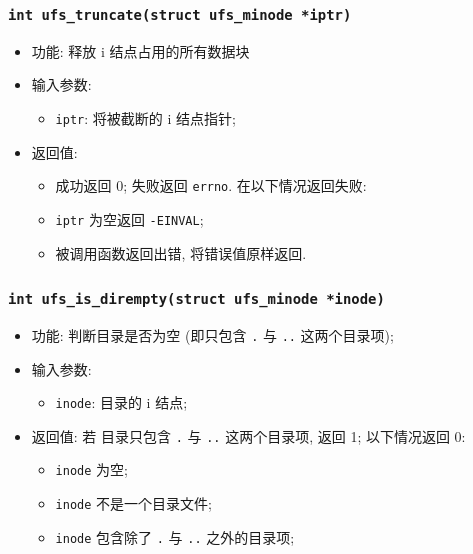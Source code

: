 \documentclass[nofonts]{ctexart}
\begin{document}
  \subsubsection[\texttt{ufs\_truncate}]{\texttt{int ufs\_truncate(struct ufs\_minode *iptr)}}
  \begin{itemize}
\item
  功能: 释放 i 结点占用的所有数据块
\item
  输入参数:

  \begin{itemize}
  \item
    \texttt{iptr}: 将被截断的 i 结点指针;
  \end{itemize}
\item
  返回值:

  \begin{itemize}
  \item
    成功返回 0; 失败返回 \texttt{errno}. 在以下情况返回失败:
  \item
    \texttt{iptr} 为空返回 \texttt{-EINVAL};
  \item
    被调用函数返回出错, 将错误值原样返回.
  \end{itemize}
  \end{itemize}
  \subsubsection[\texttt{ufs\_is\_dirempty}]{\texttt{int ufs\_is\_dirempty(struct ufs\_minode *inode)}}

  \begin{itemize}
\item
  功能: 判断目录是否为空 (即只包含 \texttt{.} 与 \texttt{..}
  这两个目录项);
\item
  输入参数:

  \begin{itemize}
  \item
    \texttt{inode}: 目录的 i 结点;
  \end{itemize}
\item
  返回值: 若 目录只包含 \texttt{.} 与 \texttt{..} 这两个目录项, 返回 1;
  以下情况返回 0:

  \begin{itemize}
  \item
    \texttt{inode} 为空;
  \item
    \texttt{inode} 不是一个目录文件;
  \item
    \texttt{inode} 包含除了 \texttt{.} 与 \texttt{..} 之外的目录项;
  \end{itemize}
  \end{itemize}
\end{document}
